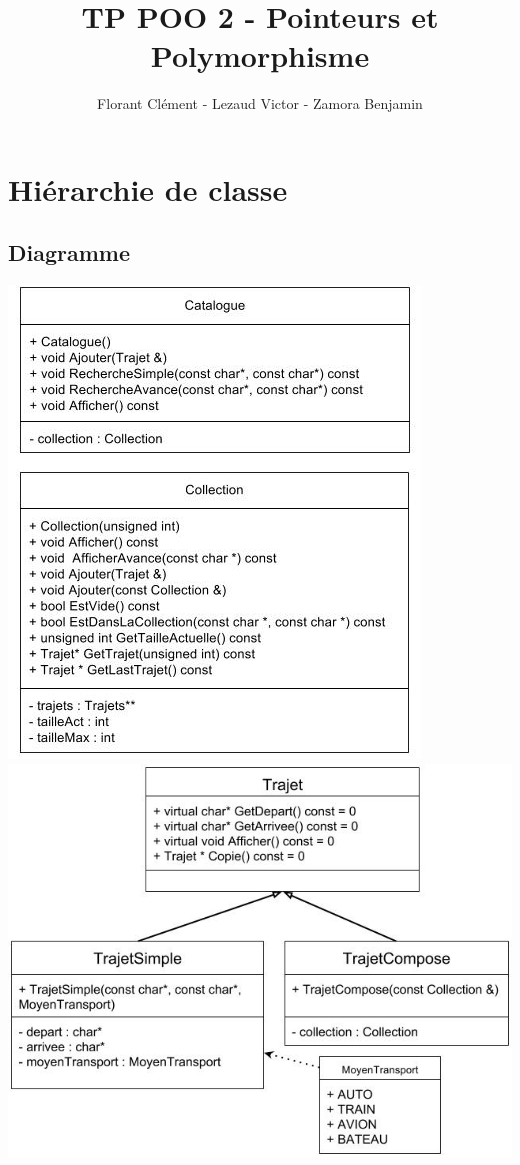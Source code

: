 \documentclass[10pt,a4paper,twoside]{article}
\author{Florant Clément - Lezaud Victor - Zamora Benjamin}
\title{TP POO 2 - Pointeurs et Polymorphisme}
\begin{document}
\maketitle
\renewcommand{\contentsname}{Sommaire}
\tableofcontents

\newpage
\section{Hiérarchie de classe}
\subsection{Diagramme}
\includegraphics[scale=0.6]{classe2.jpg} \\
\includegraphics[scale=0.5]{classe1.jpg} 
\end{document}
